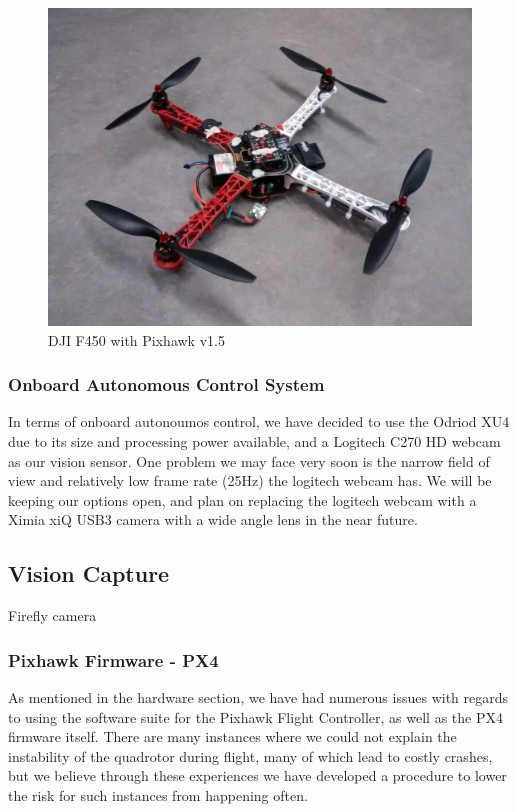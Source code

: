 \documentclass[11pt, twocolumn]{article}
\begin{document}
\begin{figure}[H]
	\centering
	\includegraphics[width=0.8\linewidth]{images/quadrotor.jpg}
	\caption{DJI F450 with Pixhawk v1.5}
\end{figure}

\subsubsection{Onboard Autonomous Control System}
In terms of onboard autonoumos control, we have decided to use the Odriod XU4 due to its size and processing power available, and a Logitech C270 HD webcam as our vision sensor. One problem we may face very soon is the narrow field of view and relatively low frame rate (25Hz) the logitech webcam has. We will be keeping our options open, and plan on replacing the logitech webcam with a Ximia xiQ USB3 camera with a wide angle lens in the near future.

\subsection{Vision Capture}
Firefly camera

\subsubsection{Pixhawk Firmware - PX4}
As mentioned in the hardware section, we have had numerous issues with regards to using the software suite for the Pixhawk Flight Controller, as well as the PX4 firmware itself. There are many instances where we could not explain the instability of the quadrotor during flight, many of which lead to costly crashes, but we believe through these experiences we have developed a procedure to lower the risk for such instances from happening often.
\end{document}
